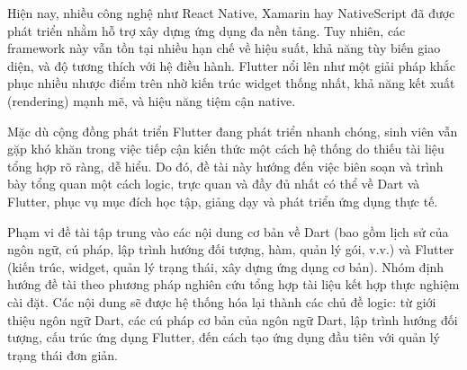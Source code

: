 Hiện nay, nhiều công nghệ như React Native, Xamarin hay NativeScript đã được phát triển nhằm hỗ trợ xây dựng ứng dụng đa nền tảng. Tuy nhiên, các framework này vẫn tồn tại nhiều hạn chế về hiệu suất, khả năng tùy biến giao diện, và độ tương thích với hệ điều hành. Flutter nổi lên như một giải pháp khắc phục nhiều nhược điểm trên nhờ kiến trúc widget thống nhất, khả năng kết xuất (rendering) mạnh mẽ, và hiệu năng tiệm cận native.

Mặc dù cộng đồng phát triển Flutter đang phát triển nhanh chóng, sinh viên vẫn gặp khó khăn trong việc tiếp cận kiến thức một cách hệ thống do thiếu tài liệu tổng hợp rõ ràng, dễ hiểu. Do đó, đề tài này hướng đến việc biên soạn và trình bày tổng quan một cách logic, trực quan và đầy đủ nhất có thể về Dart và Flutter, phục vụ mục đích học tập, giảng dạy và phát triển ứng dụng thực tế.

Phạm vi đề tài tập trung vào các nội dung cơ bản về Dart (bao gồm lịch sử của ngôn ngữ, cú pháp, lập trình hướng đối tượng, hàm, quản lý gói, v.v.) và Flutter (kiến trúc, widget, quản lý trạng thái, xây dựng ứng dụng cơ bản). Nhóm định hướng đề tài theo phương pháp nghiên cứu tổng hợp tài liệu kết hợp thực nghiệm cài đặt. Các nội dung sẽ được hệ thống hóa lại thành các chủ đề logic: từ giới thiệu ngôn ngữ Dart, các cú pháp cơ bản của ngôn ngữ Dart, lập trình hướng đối tượng, cấu trúc ứng dụng Flutter, đến cách tạo ứng dụng đầu tiên với quản lý trạng thái đơn giản.

